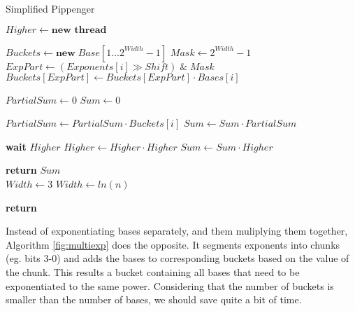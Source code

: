 \begin{algorithm}[h]
\caption{Simplified Pippenger}\label{fig:multiexp}
\begin{algorithmic}[1]

        \State $Higher \gets \textbf{new thread}$ 
    \EndIf

    \State $Buckets \gets \textbf{new} \; Base[1\dots2^{Width}-1]$
    \State $Mask \gets 2^{Width}-1$
        \State $ExpPart \gets (Exponents[i] \gg Shift) \; \&  \;Mask$
            \State $Buckets[ExpPart] \gets Buckets[ExpPart] \cdot Bases[i]$
        \EndIf
    \EndFor
    
    \State $PartialSum \gets 0$
    \State $Sum \gets 0$
    
        \State $PartialSum \gets PartialSum \cdot Buckets[i]$
        \State $Sum \gets Sum \cdot PartialSum$
    \EndFor
    
        \State \textbf{wait} $Higher$
            \State $Higher \gets Higher \cdot Higher$
        \EndFor
        \State $Sum \gets Sum \cdot Higher$ 
    \EndIf
    
    \State \textbf{return} $Sum$
\EndFunction
\\
        \State $Width \gets 3$
    \Else
        \State $Width \gets ln(n)$
    \EndIf

    \State \textbf{return} 
    
\EndFunction
\end{algorithmic}
\end{algorithm}
\FloatBarrier
\noindent Instead of exponentiating bases separately, and them muliplying them together, Algorithm \ref{fig:multiexp} does the opposite. It segments exponents into chunks (eg. bits 3-0) and adds the bases to corresponding buckets based on the value of the chunk. This results a bucket containing all bases that need to be exponentiated to the same power. Considering that the number of buckets is smaller than the number of bases, we should save quite a bit of time.\\
\\

